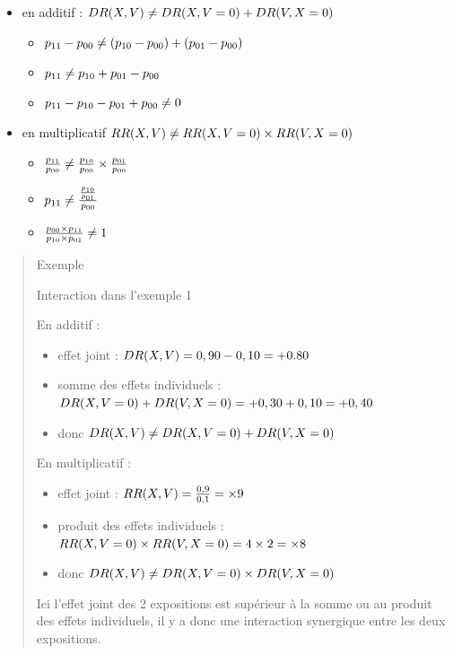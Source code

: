 \documentclass[
]{book}
\providecommand{\tightlist}{%
  \setlength{\itemsep}{0pt}\setlength{\parskip}{0pt}}
\begin{document}
\begin{itemize}
\tightlist
\item
  en additif : \(\small DR(X,V) \neq DR(X,V=0) + DR(V,X=0)\)

  \begin{itemize}
  \tightlist
  \item
    \(\small p_{11}-p_{00} \neq (p_{10}-p_{00})+(p_{01}-p_{00})\)
  \item
    \(\small p_{11} \neq p_{10} + p_{01} - p_{00}\)
  \item
    \(\small p_{11} - p_{10} - p_{01} + p_{00} \neq 0\)
  \end{itemize}
\item
  en multiplicatif \(\small RR(X,V) \neq RR(X,V=0) \times RR(V,X=0)\)

  \begin{itemize}
  \tightlist
  \item
    \(\small \frac{p_{11}}{p_{00}} \neq \frac{p_{10}}{p_{00}} \times \frac{p_{01}}{p_{00}}\)
  \item
    \(\small p_{11} \neq \frac{\frac{p_{10}}{p_{01}}}{p_{00}}\)
  \item
    \(\small \frac{p_{00} \times p_{11}}{p_{10} \times p_{01}} \neq 1\)
  \end{itemize}
\end{itemize}

\begin{quote}
Exemple

Interaction dans l'exemple 1

En additif :

\begin{itemize}
\tightlist
\item
  effet joint : \(\small DR(X,V) = 0,90 - 0,10 = +0.80\)
\item
  somme des effets individuels : \(\small DR(X,V=0) + DR(V,X=0) = +0,30 +0,10 = +0,40\)
\item
  donc \(\small DR(X,V) \neq DR(X,V=0) + DR(V,X=0)\)
\end{itemize}

En multiplicatif :

\begin{itemize}
\tightlist
\item
  effet joint : \(\small RR(X,V) = \frac{0,9}{0,1} = \times 9\)
\item
  produit des effets individuels : \(\small RR(X,V=0) \times RR(V,X=0) = 4 \times 2 = \times 8\)
\item
  donc \(\small DR(X,V) \neq DR(X,V=0) \times DR(V,X=0)\)
\end{itemize}

Ici l'effet joint des 2 expositions est supérieur à la somme ou au produit des effets individuels, il y a donc une interaction synergique entre les deux expositions.
\end{quote}
\end{document}
